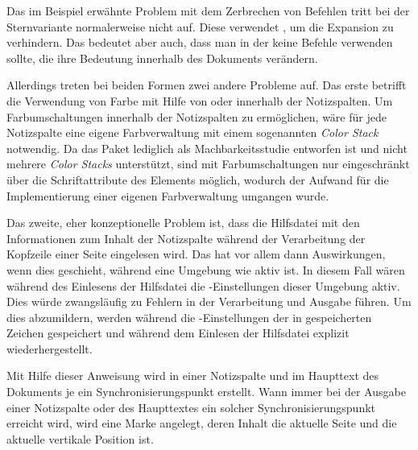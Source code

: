 Das im Beispiel erwähnte
Problem mit dem Zerbrechen von Befehlen tritt bei der
Sternvariante normalerweise nicht auf. Diese
verwendet , um die Expansion zu verhindern. Das bedeutet
aber auch, dass man in der  keine Befehle verwenden sollte, die
ihre Bedeutung innerhalb des Dokuments verändern.

Allerdings treten bei beiden Formen zwei andere Probleme
auf. Das erste betrifft die Verwendung von Farbe mit Hilfe von
 oder 
innerhalb der Notizspalten. Um Farbumschaltungen innerhalb der Notizspalten zu
ermöglichen, wäre für jede Notizspalte eine eigene Farbverwaltung mit einem
sogenannten \emph{Color Stack} notwendig. Da das Paket lediglich als
Machbarkeitsstudie entworfen ist und \XeTeX{} nicht mehrere \emph{Color
  Stacks} unterstützt, sind mit \XeTeX{} Farbumschaltungen nur eingeschränkt
über die Schriftattribute des Elements  möglich, wodurch der Aufwand für die Implementierung einer
eigenen Farbverwaltung umgangen wurde.

Das zweite, eher konzeptionelle Problem ist, dass die
Hilfsdatei mit den Informationen zum Inhalt der Notizspalte während der
Verarbeitung der Kopfzeile einer Seite eingelesen wird. Das hat vor allem dann
Auswirkungen, wenn dies geschieht, während eine Umgebung wie
 aktiv ist. In diesem Fall wären während des Einlesens
der Hilfsdatei die -Einstellungen dieser Umgebung aktiv. Dies
würde zwangsläufig zu Fehlern in der Verarbeitung und Ausgabe führen. Um dies
abzumildern, werden während  die
-Einstellungen der in 
gespeicherten Zeichen gespeichert und während dem Einlesen der Hilfsdatei
explizit wiederhergestellt.%
\EndIndexGroup


\begin{Declaration}
\end{Declaration}
Mit Hilfe dieser Anweisung wird in einer Notizspalte und im Haupttext des
Dokuments je ein
Synchronisierungspunkt
erstellt. Wann immer bei der Ausgabe einer Notizspalte oder des Haupttextes
ein solcher Synchronisierungspunkt erreicht wird, wird eine Marke angelegt,
deren Inhalt die aktuelle Seite und die aktuelle vertikale Position ist.

